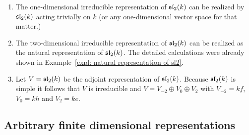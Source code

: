 \begin{expls}
 \begin{enumerate}[leftmargin=*]
  \item
   The one-dimensional irreducible representation of $\mathfrak{sl}_2(k)$ can be realized by $\mathfrak{sl}_2(k)$ acting trivially on $k$ (or any one-dimensional vector space for that matter.)
  \item
   The two-dimensional irreducible representation of $\mathfrak{sl}_2(k)$ can be realized as the natural representation of $\mathfrak{sl}_2(k)$. The detailed calculations were already shown in Example~\ref{expl: natural representation of sl2}.
  \item
   Let $V = \mathfrak{sl}_2(k)$ be the adjoint representation of $\mathfrak{sl}_2(k)$. Because $\mathfrak{sl}_2(k)$ is simple it follows that $V$ is irreducible and $V = V_{-2} \oplus V_0 \oplus V_2$ with $V_{-2} = k f$, $V_0 = k h$ and $V_2 = k e$.
 \end{enumerate}
\end{expls}





\subsection{Arbitrary finite dimensional representations}


